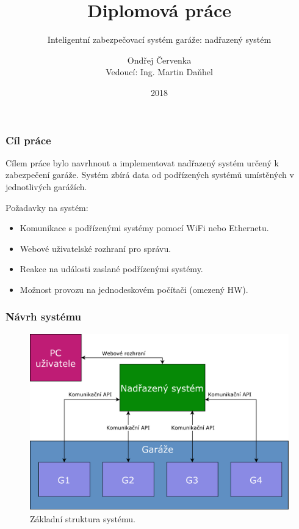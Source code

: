 \documentclass{beamer}
\title
{Diplomová práce}
\subtitle{Inteligentní zabezpečovací systém garáže: nadřazený systém }
\author
{Ondřej Červenka \\ Vedoucí: Ing. Martin Daňhel}
\institute
{
  České vysoké učení technické v Praze\\
  Fakulta informačních technologií
}
\date{2018}
\begin{document}
  \frame{\titlepage}
  \begin{frame}
    \frametitle{Cíl práce}

    Cílem práce bylo navrhnout a implementovat nadřazený systém určený k zabezpečení garáže. Systém zbírá data od podřízených systémů umístěných v jednotlivých garážích.

    \hspace{1cm}

    Požadavky na systém:

    \begin{itemize}
      \item Komunikace s podřízenými systémy pomocí WiFi nebo Ethernetu.
      \item Webové uživatelské rozhraní pro správu.
      \item Reakce na události zaslané podřízenými systémy.
      \item Možnost provozu na jednodeskovém počítači (omezený HW).
    \end{itemize}
  \end{frame}

  \begin{frame}
    \frametitle{Návrh systému}

    \begin{figure}
        \includegraphics[scale=0.3]{../images/basic_struct.pdf}
        \caption{Základní struktura systému.}
      \end{figure}

  \end{frame}
\end{document}
